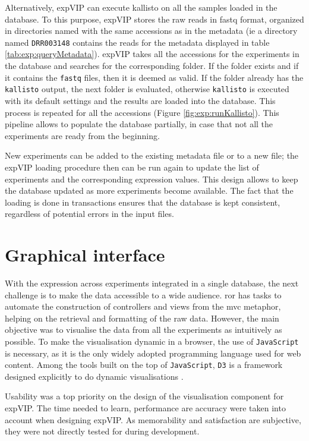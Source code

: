 Alternatively, expVIP can execute kallisto on all the samples loaded in the database. 
To this purpose, expVIP stores the raw reads in fastq format, organized in directories named with the same accessions as in the metadata (ie a directory named \verb|DRR003148| contains the reads for the metadata displayed in table \ref{tab:exp:queryMetadata}). 
expVIP takes all the accessions for the experiments in the database and searches for the corresponding folder. 
If the folder exists and if it contains the \verb|fastq| files, then it is deemed as valid. 
If the folder already has the \verb|kallisto| output, the next folder is evaluated, otherwise \verb|kallisto| is executed with its default settings and the results are loaded into the database. 
This process is repeated for all the accessions (Figure \ref{fig:exp:runKallisto}).  
This pipeline allows to populate the database partially, in case that not all the experiments are ready from the beginning. 

New experiments can be added to the existing metadata file  or to a new file; the expVIP loading procedure then can be run again to update the list of experiments and the corresponding expression values. 
This design allows to keep the database updated as more experiments become available. 
The fact that the loading is done in transactions ensures that the database is kept consistent, regardless of potential errors in the input files. 

\section{Graphical interface}
\label{exp:gui}  
With the expression across experiments integrated in a single database, the next challenge is to make the data accessible to a wide audience. 
\acrshort{ror} has tasks to automate the construction of controllers and views from the \acrshort{mvc} metaphor, helping on the retrieval and formatting of the raw data. 
However, the main objective was to visualise the data from all the experiments as intuitively as possible. 
To make the visualisation dynamic in a browser, the use of \verb|JavaScript| is necessary, as it is the only widely adopted programming language used for web content. 
Among the tools built on the top of \verb|JavaScript|, \verb|D3| is a framework designed explicitly to do dynamic visualisations \citep{Bostock2011}. 

Usability was a top priority on the design of the visualisation component for expVIP. 
The time needed to learn, performance are accuracy were taken into account when designing expVIP. 
As memorability and satisfaction are subjective, they were not directly tested for during development.  


